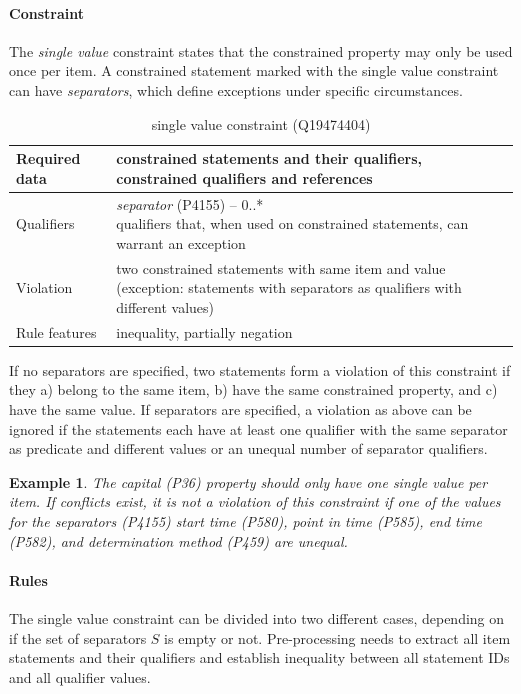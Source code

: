 \documentclass[hyperref,bachelorofscience,fleqn]{cgvpub}
\newtheorem{example}{Example}
\begin{document}
\paragraph{Constraint}
The \emph{single value} constraint states that the constrained property may only be used once per item. A constrained statement marked with the single value constraint can have \emph{separators}, which define exceptions under specific circumstances.
\begin{table}[H]
\caption{single value constraint (Q19474404)}
\begin{tabularx}{\textwidth}{ ll X}
\hline
Required data & constrained statements and their qualifiers, constrained qualifiers and references \\
\hline
Qualifiers & \makecell{\emph{separator} (P4155) -- 0..* \\ qualifiers that, when used on constrained statements, can warrant an exception} \\
\hline
Violation & \makecell{two constrained statements with same item and value \\ (exception: statements with separators as qualifiers with different values)} \\
\hline
Rule features & inequality, partially negation \\
\hline
\end{tabularx}
\end{table}

If no separators are specified, two statements form a violation of this constraint if they a) belong to the same item, b) have the same constrained property, and c) have the same value.
If separators are specified, a violation as above can be ignored if the statements each have at least one qualifier with the same separator as predicate and different values or an unequal number of separator qualifiers.

\begin{example}
The \emph{capital} (P36) property should only have one single value per item. If conflicts exist, it is not a violation of this constraint if one of the values for the \emph{separators} (P4155) \emph{start time} (P580), \emph{point in time} (P585), \emph{end time} (P582), and \emph{determination method} (P459) are unequal.
\end{example}

\paragraph{Rules}
The single value constraint can be divided into two different cases, depending on if the set of separators \(S\) is empty or not. Pre-processing needs to extract all item statements and their qualifiers and establish inequality between all statement IDs and all qualifier values.
\end{document}
